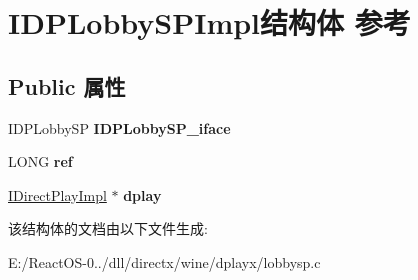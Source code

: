 \hypertarget{struct_i_d_p_lobby_s_p_impl}{}\section{I\+D\+P\+Lobby\+S\+P\+Impl结构体 参考}
\label{struct_i_d_p_lobby_s_p_impl}
\subsection*{Public 属性}
\begin{DoxyCompactItemize}
\item 
\mbox{\label{struct_i_d_p_lobby_s_p_impl_adaa0f1d14615ebb66494549b3c650c59}} 
I\+D\+P\+Lobby\+SP {\bfseries I\+D\+P\+Lobby\+S\+P\+\_\+iface}
\item 
\mbox{\label{struct_i_d_p_lobby_s_p_impl_a458f8e4b495f7a407d827650894b59da}} 
L\+O\+NG {\bfseries ref}
\item 
\mbox{\label{struct_i_d_p_lobby_s_p_impl_a6ad0a49ef077c2b64528280318000a62}} 
\hyperlink{struct_i_direct_play_impl}{I\+Direct\+Play\+Impl} $\ast$ {\bfseries dplay}
\end{DoxyCompactItemize}


该结构体的文档由以下文件生成\+:\begin{DoxyCompactItemize}
\item 
E\+:/\+React\+O\+S-\/0../dll/directx/wine/dplayx/lobbysp.\+c\end{DoxyCompactItemize}
